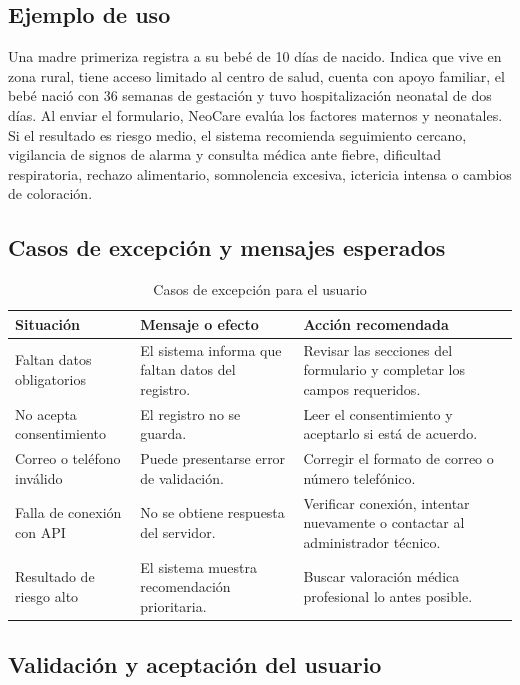 \documentclass[12pt,letterpaper]{article}
\begin{document}
\subsection{Ejemplo de uso}

Una madre primeriza registra a su bebé de 10 días de nacido. Indica que vive en zona rural, tiene acceso limitado al centro de salud, cuenta con apoyo familiar, el bebé nació con 36 semanas de gestación y tuvo hospitalización neonatal de dos días. Al enviar el formulario, NeoCare evalúa los factores maternos y neonatales. Si el resultado es riesgo medio, el sistema recomienda seguimiento cercano, vigilancia de signos de alarma y consulta médica ante fiebre, dificultad respiratoria, rechazo alimentario, somnolencia excesiva, ictericia intensa o cambios de coloración.

\subsection{Casos de excepción y mensajes esperados}

\begin{longtable}{p{}p{}p{}}
\caption{Casos de excepción para el usuario}\\
\toprule
\textbf{Situación} & \textbf{Mensaje o efecto} & \textbf{Acción recomendada}\\
\midrule
Faltan datos obligatorios & El sistema informa que faltan datos del registro. & Revisar las secciones del formulario y completar los campos requeridos.\\
No acepta consentimiento & El registro no se guarda. & Leer el consentimiento y aceptarlo si está de acuerdo.\\
Correo o teléfono inválido & Puede presentarse error de validación. & Corregir el formato de correo o número telefónico.\\
Falla de conexión con API & No se obtiene respuesta del servidor. & Verificar conexión, intentar nuevamente o contactar al administrador técnico.\\
Resultado de riesgo alto & El sistema muestra recomendación prioritaria. & Buscar valoración médica profesional lo antes posible.\\
\bottomrule
\end{longtable}

\subsection{Validación y aceptación del usuario}
\end{document}
